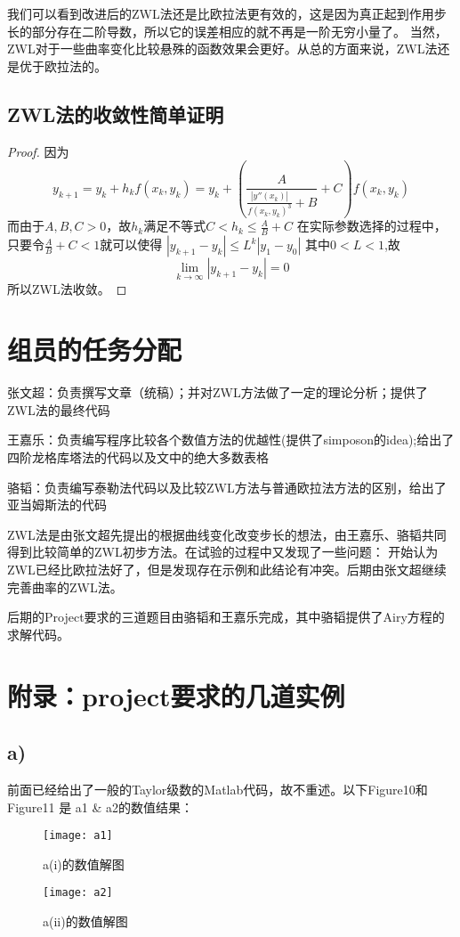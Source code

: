 \documentclass[a4paper,12pt]{article}
\begin{document}
\par
我们可以看到改进后的ZWL法还是比欧拉法更有效的，这是因为真正起到作用步长的部分存在二阶导数，所以它的误差相应的就不再是一阶无穷小量了。
当然，ZWL对于一些曲率变化比较悬殊的函数效果会更好。从总的方面来说，ZWL法还是优于欧拉法的。

\subsection{ZWL法的收敛性简单证明}
\begin{proof}
    因为\[y_{k+1}=y_k+h_kf(x_k,y_k)=y_{k}+\left(\frac{A}{\frac{|y''(x_k)|}{f(x_k,y_k)^3}+B}+C\right)f(x_k,y_k)\]
而由于$A,B,C>0$，故$h_k$满足不等式$C<h_k\leq \frac{A}{B}+C$
在实际参数选择的过程中，只要令$\frac{A}{B}+C<1$就可以使得
$|y_{k+1}-y_{k}|\leq L^{k}|y_1-y_0|$
其中$0<L<1$,故$$\lim_{k\rightarrow\infty}|y_{k+1}-y_{k}|=0$$
所以ZWL法收敛。
\end{proof}


\section{组员的任务分配}
张文超：负责撰写文章（统稿）；并对ZWL方法做了一定的理论分析；提供了ZWL法的最终代码\par
王嘉乐：负责编写程序比较各个数值方法的优越性(提供了simposon的idea);给出了四阶龙格库塔法的代码以及文中的绝大多数表格\par
骆韬：负责编写泰勒法代码以及比较ZWL方法与普通欧拉法方法的区别，给出了亚当姆斯法的代码\par
ZWL法是由张文超先提出的根据曲线变化改变步长的想法，由王嘉乐、骆韬共同得到比较简单的ZWL初步方法。在试验的过程中又发现了一些问题：
开始认为ZWL已经比欧拉法好了，但是发现存在示例和此结论有冲突。后期由张文超继续完善曲率的ZWL法。\par
后期的Project要求的三道题目由骆韬和王嘉乐完成，其中骆韬提供了Airy方程的求解代码。\par


\section{附录：project要求的几道实例}
\subsection{a)}
前面已经给出了一般的Taylor级数的Matlab代码，故不重述。以下Figure10和Figure11
是 a1 \& a2的数值结果：
\begin{figure*}
\begin{minipage}[t]{0.5\textwidth}
\centering
\texttt{[image: a1]}
\caption{a(i)的数值解图}
\end{minipage}%
\begin{minipage}[t]{0.5\textwidth}
\centering
\texttt{[image: a2]}
\caption{a(ii)的数值解图}
\end{minipage}%
\end{figure*}
\end{document}
